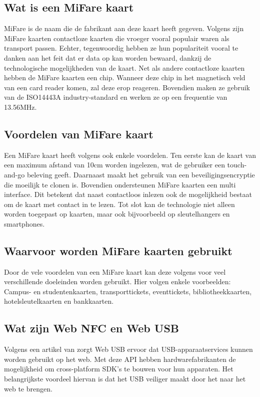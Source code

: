 \subsection{Wat is een MiFare kaart}
MiFare is de naam die de fabrikant aan deze kaart heeft gegeven. Volgens \textcite{Digitalid} zijn MiFare kaarten contactloze kaarten die vroeger vooral populair waren als transport passen. Echter, tegenwoordig hebben ze hun populariteit vooral te danken aan het feit dat er data op kan worden bewaard, dankzij de technologische mogelijkheden van de kaart.
Net als andere contactloze kaarten hebben de MiFare kaarten een chip. Wanneer deze chip in het magnetisch veld van een card reader komen, zal deze erop reageren. Bovendien maken ze gebruik van de ISO14443A industry-standard en werken ze op een frequentie van 13.56MHz.

\subsection{Voordelen van MiFare kaart}
Een MiFare kaart heeft volgens \textcite{Printplast} ook enkele voordelen. Ten eerste kan de kaart van een maximum afstand van 10cm worden ingelezen, wat de gebruiker een touch-and-go beleving geeft.
Daarnaast maakt het gebruik van een beveiligingsencryptie die moeilijk te clonen is. Bovendien ondersteunen MiFare kaarten een multi interface. Dit betekent dat naast contactloos inlezen ook de mogelijkheid bestaat om de kaart met contact in te lezen. Tot slot kan de technologie niet alleen worden toegepast op kaarten, maar ook bijvoorbeeld op sleutelhangers en smartphones.

\subsection{Waarvoor worden MiFare kaarten gebruikt}
Door de vele voordelen van een MiFare kaart kan deze volgens \textcite{Digitalid} voor veel verschillende doeleinden worden gebruikt. Hier volgen enkele voorbeelden: Campus- en studentenkaarten, transporttickets, eventtickets, bibliotheekkaarten, hotelsleutelkaarten en bankkaarten.

\subsection{Wat zijn Web NFC en Web USB}
Volgens een artikel van \textcite{FrançoisBeaufortUSB} zorgt Web USB ervoor dat USB-apparaatservices kunnen worden gebruikt op het web. Met deze API hebben hardwarefabrikanten de mogelijkheid om cross-platform SDK's te bouwen voor hun apparaten. Het belangrijkste voordeel hiervan is dat het USB veiliger maakt door het naar het web te brengen.

